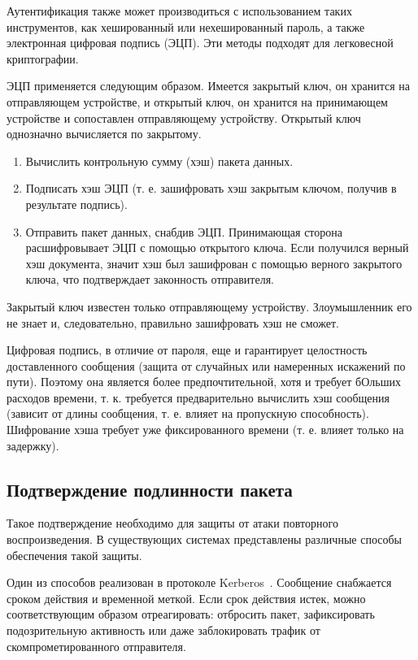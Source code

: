 Аутентификация также может производиться с использованием таких инструментов, как хешированный или нехешированный пароль, а также электронная цифровая подпись (ЭЦП). Эти методы подходят для легковесной криптографии.

ЭЦП применяется следующим образом. Имеется закрытый ключ, он хранится на отправляющем устройстве, и открытый ключ, он хранится на принимающем устройстве и сопоставлен отправляющему устройству. Открытый ключ однозначно вычисляется по закрытому.
\begin{enumerate}
	\item Вычислить контрольную сумму (хэш) пакета данных.
	\item Подписать хэш ЭЦП (т. е. зашифровать хэш закрытым ключом, получив в результате подпись).
	\item Отправить пакет данных, снабдив ЭЦП. Принимающая сторона расшифровывает ЭЦП с помощью открытого ключа. Если получился верный хэш документа, значит хэш был зашифрован с помощью верного закрытого ключа, что подтверждает законность отправителя.
\end{enumerate} 

Закрытый ключ известен только отправляющему устройству. Злоумышленник его не знает и, следовательно, правильно зашифровать хэш не сможет.

Цифровая подпись, в отличие от пароля, еще и гарантирует целостность доставленного сообщения (защита от случайных или намеренных искажений по пути). Поэтому она является более предпочтительной, хотя и требует бОльших расходов времени, т. к. требуется предварительно вычислить хэш сообщения (зависит от длины сообщения, т. е. влияет на пропускную способность). Шифрование хэша требует уже фиксированного времени (т. е. влияет только на задержку).

\subsection{Подтверждение подлинности пакета}

Такое подтверждение необходимо для защиты от атаки повторного воспроизведения. В существующих системах представлены различные способы обеспечения такой защиты.

Один из способов реализован в протоколе Kerberos~\cite{src28}.  Сообщение снабжается сроком действия и временной меткой. Если срок действия истек, можно соответствующим образом отреагировать: отбросить пакет, зафиксировать подозрительную активность или даже заблокировать трафик от скомпрометированного отправителя.

